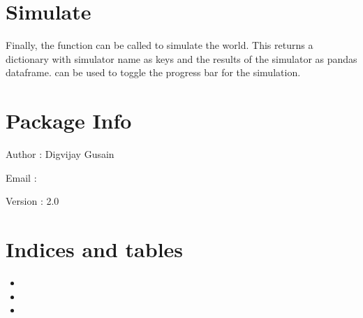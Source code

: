 \documentclass[letterpaper,10pt,english]{sphinxmanual}
\begin{document}
\chapter{Simulate}
\label{\detokenize{index:simulate}}
Finally, the  function can be called to simulate the world.
This returns a dictionary with simulator name as keys and the results of
the simulator as pandas dataframe.
 can be used to toggle the progress bar for the simulation.

\begin{sphinxVerbatim}[commandchars=\\\{\}]
\end{sphinxVerbatim}


\chapter{Package Info}
\label{\detokenize{index:package-info}}
Author : Digvijay Gusain

Email : 

Version : 2.0


\chapter{Indices and tables}
\label{\detokenize{index:indices-and-tables}}\begin{itemize}
\item {} 

\item {} 

\item {} 

\end{itemize}



\renewcommand{\indexname}{Index}
\printindex
\end{document}
